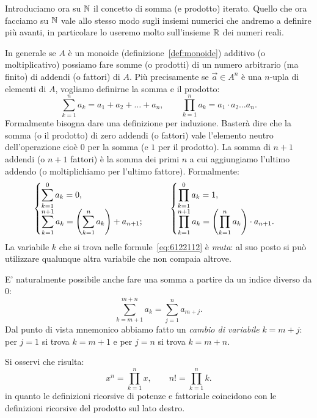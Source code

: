 Introduciamo ora su ${\mathbb N}$ il concetto di somma (e prodotto) iterato.
Quello che ora facciamo su ${\mathbb N}$ vale allo stesso modo sugli insiemi 
numerici che andremo a definire più avanti, in particolare lo useremo 
molto sull'insieme ${\mathbb R}$ dei numeri reali. 

In generale se $A$ è un monoide (definizione~\ref{def:monoide}) additivo 
(o moltiplicativo) possiamo fare somme (o prodotti) di un numero 
arbitrario (ma finito) di addendi (o fattori) di $A$.
Più precisamente se $\vec a \in A^n$ 
è una $n$-upla di elementi di $A$, 
vogliamo definirne la somma e il prodotto:
\begin{equation}\label{eq:6122112}
\sum_{k=1}^n a_k = a_1 + a_2 + \dots + a_n,
\qquad 
\prod_{k=1}^n a_k = a_1 \cdot a_2 \dots a_n.
\end{equation}
Formalmente bisogna dare una definizione per induzione. 
Basterà dire che la somma (o il prodotto)
di zero addendi (o fattori) vale l'elemento neutro 
dell'operazione cioè $0$ per la somma (e $1$ per il prodotto).
La somma di $n+1$ addendi (o $n+1$ fattori) è la somma dei primi $n$ 
a cui aggiungiamo l'ultimo addendo (o moltiplichiamo per l'ultimo fattore).
Formalmente:
\[
  \begin{cases}
    \displaystyle\sum_{k=1}^{0} a_k = 0, \\
    \displaystyle\sum_{k=1}^{n+1} a_k = {\left( \sum_{k=1}^{n} a_k \right)} + a_{n+1};
  \end{cases}  \qquad
  \begin{cases}
    \displaystyle\prod_{k=1}^{0} a_k = 1, \\
    \displaystyle\prod_{k=1}^{n+1} a_k = {\left( \prod_{k=1}^{n} a_k \right)} \cdot a_{n+1}.
  \end{cases}
\]
La variabile $k$ che si trova nelle formule~\eqref{eq:6122112} è \emph{muta}: 
al suo posto si può utilizzare qualunque altra variabile che non
compaia altrove.

E' naturalmente possibile anche fare una somma a partire da un indice 
diverso da $0$:
\[
  \sum_{k=m+1}^{m+n} a_k = \sum_{j=1}^{n} a_{m+j}.
\]
Dal punto di vista mnemonico abbiamo fatto 
un \emph{cambio di variabile} $k=m+j$:
per $j=1$ si trova $k=m+1$ e per $j=n$ si trova $k=m+n$.

Si osservi che risulta:
\[
  x^n = \prod_{k=1}^n x, \qquad 
  n! = \prod_{k=1}^n k.  
\]
in quanto le definizioni ricorsive di potenze e fattoriale
coincidono con le definizioni ricorsive del prodotto sul lato destro.

